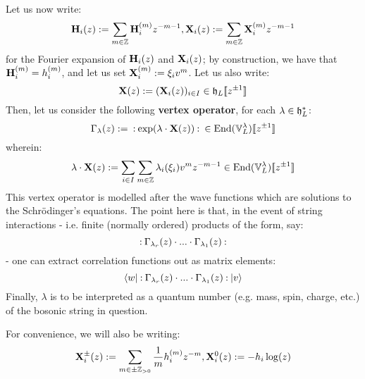         Let us now write:
            $$\mathbf{H}_i(z) := \sum_{m \in \mathbb{Z}} \mathbf{H}_i^{(m)} z^{-m - 1}, \mathbf{X}_i(z) := \sum_{m \in \mathbb{Z}} \mathbf{X}_i^{(m)} z^{-m - 1}$$
        for the Fourier expansion of $\mathbf{H}_i(z)$ and $\mathbf{X}_i(z)$; by construction, we have that $\mathbf{H}_i^{(m)} = h_i^{(m)}$, and let us set $\mathbf{X}_i^{(m)} := \xi_i v^m$. Let us also write:
            $$\mathbf{X}(z) := ( \mathbf{X}_i(z) )_{i \in I} \in \mathfrak{h}_L[\![z^{\pm 1}]\!]$$
        Then, let us consider the following \textbf{vertex operator}, for each $\lambda \in \mathfrak{h}_L^*$:
            $$\Gamma_{\lambda}(z) := \: \mathbf{:} \: { \exp( \lambda \cdot \mathbf{X}(z) ) }  \: \mathbf{:} \: \in \mathrm{End}(\mathbb{V}_L^{\lambda})[\![z^{\pm 1}]\!]$$
        wherein:
            $$\lambda \cdot \mathbf{X}(z) := \sum_{i \in I} \sum_{m \in \mathbb{Z}} \lambda_i(\xi_i) v^m z^{-m - 1} \in \mathrm{End}(\mathbb{V}_L^{\lambda})[\![z^{\pm 1}]\!]$$
        This vertex operator is modelled after the wave functions which are solutions to the Schr\"odinger's equations. The point here is that, in the event of string interactions - i.e. finite (normally ordered) products of the form, say:
            $$\: \mathbf{:} \: { \Gamma_{\lambda_r}(z) \cdot ... \cdot \Gamma_{\lambda_1}(z) }  \: \mathbf{:} \:$$
        - one can extract correlation functions out as matrix elements:
            $$\langle {w} \rvert \: \mathbf{:} \: { \Gamma_{\lambda_r}(z) \cdot ... \cdot \Gamma_{\lambda_1}(z) }  \: \mathbf{:} \: \lvert {v} \rangle$$
        Finally, $\lambda$ is to be interpreted as a quantum number (e.g. mass, spin, charge, etc.) of the bosonic string in question.

        \begin{convention}
            For convenience, we will also be writing:
                $$\mathbf{X}_i^{\pm}(z) := \sum_{m \in \pm \mathbb{Z}_{> 0}} \frac1m h_i^{(m)} z^{-m}, \mathbf{X}_i^0(z) := -h_i \log(z)$$
        \end{convention}
        
